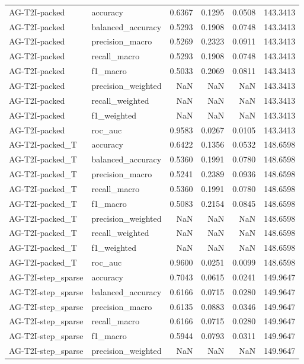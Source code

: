 \begin{tabular}{llrrrr}
AG-T2I-packed & accuracy & 0.6367 & 0.1295 & 0.0508 & 143.3413 \\
AG-T2I-packed & balanced_accuracy & 0.5293 & 0.1908 & 0.0748 & 143.3413 \\
AG-T2I-packed & precision_macro & 0.5269 & 0.2323 & 0.0911 & 143.3413 \\
AG-T2I-packed & recall_macro & 0.5293 & 0.1908 & 0.0748 & 143.3413 \\
AG-T2I-packed & f1_macro & 0.5033 & 0.2069 & 0.0811 & 143.3413 \\
AG-T2I-packed & precision_weighted & NaN & NaN & NaN & 143.3413 \\
AG-T2I-packed & recall_weighted & NaN & NaN & NaN & 143.3413 \\
AG-T2I-packed & f1_weighted & NaN & NaN & NaN & 143.3413 \\
AG-T2I-packed & roc_auc & 0.9583 & 0.0267 & 0.0105 & 143.3413 \\
AG-T2I-packed_T & accuracy & 0.6422 & 0.1356 & 0.0532 & 148.6598 \\
AG-T2I-packed_T & balanced_accuracy & 0.5360 & 0.1991 & 0.0780 & 148.6598 \\
AG-T2I-packed_T & precision_macro & 0.5241 & 0.2389 & 0.0936 & 148.6598 \\
AG-T2I-packed_T & recall_macro & 0.5360 & 0.1991 & 0.0780 & 148.6598 \\
AG-T2I-packed_T & f1_macro & 0.5083 & 0.2154 & 0.0845 & 148.6598 \\
AG-T2I-packed_T & precision_weighted & NaN & NaN & NaN & 148.6598 \\
AG-T2I-packed_T & recall_weighted & NaN & NaN & NaN & 148.6598 \\
AG-T2I-packed_T & f1_weighted & NaN & NaN & NaN & 148.6598 \\
AG-T2I-packed_T & roc_auc & 0.9600 & 0.0251 & 0.0099 & 148.6598 \\
AG-T2I-step_sparse & accuracy & 0.7043 & 0.0615 & 0.0241 & 149.9647 \\
AG-T2I-step_sparse & balanced_accuracy & 0.6166 & 0.0715 & 0.0280 & 149.9647 \\
AG-T2I-step_sparse & precision_macro & 0.6135 & 0.0883 & 0.0346 & 149.9647 \\
AG-T2I-step_sparse & recall_macro & 0.6166 & 0.0715 & 0.0280 & 149.9647 \\
AG-T2I-step_sparse & f1_macro & 0.5944 & 0.0793 & 0.0311 & 149.9647 \\
AG-T2I-step_sparse & precision_weighted & NaN & NaN & NaN & 149.9647 \\

\end{tabular}

